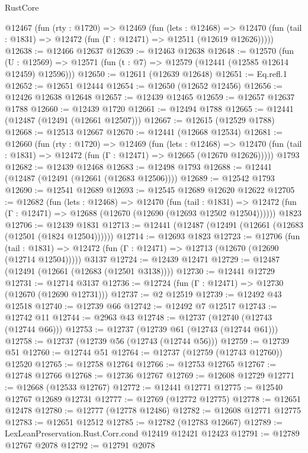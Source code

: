 \begin{lexlean}{RustCore}
\begin{coremodule}
  @12467
    (fun (rty : @1720) =>
    @12469
      (fun (lets : @12468) =>
      @12470 (fun (tail : @1831) => @12472 (fun (Γ : @12471) => @12511 (@12619 @12626)))))
@12638 := @12466 @12637
@12639 := @12463 @12638
@12648 := @12570
    (fun (U : @12569) => @12571 (fun (t : @7) => @12579 (@12441 (@12585 @12614 @12459) @12596)))
@12650 := @12611 (@12639 @12648)
@12651 := Eq.refl.{1}
@12652 := @12651 @12444
@12654 := @12650 (@12652 @12456)
@12656 := @12426 @12638 @12648
@12657 := @12439 @12465
@12659 := @12657 @12637 @1788
@12660 := @12439 @1720
@12661 := @12494 @1788
@12665 := @12441 (@12487 (@12491 (@12661 @12507)))
@12667 := @12615 (@12529 @1788)
@12668 := @12513 @12667
@12670 := @12441 (@12668 @12534)
@12681 := @12660
    (fun (rty : @1720) =>
    @12469
      (fun (lets : @12468) =>
      @12470 (fun (tail : @1831) => @12472 (fun (Γ : @12471) => @12665 (@12670 @12626)))))
    @1793
@12682 := @12439 @12468
@12683 := @12498 @1793
@12688 := @12441 (@12487 (@12491 (@12661 (@12683 @12506))))
@12689 := @12542 @1793
@12690 := @12541 @12689
@12693 := @12545 @12689 @12620 @12622
@12705 := @12682
    (fun (lets : @12468) =>
    @12470
      (fun (tail : @1831) =>
      @12472 (fun (Γ : @12471) => @12688 (@12670 (@12690 (@12693 @12502 @12504))))))
    @1823
@12706 := @12439 @1831
@12713 := @12441 (@12487 (@12491 (@12661 (@12683 (@12501 (@1824 @12504))))))
@12714 := @12693 @1823
@12723 := @12706
    (fun (tail : @1831) => @12472 (fun (Γ : @12471) => @12713 (@12670 (@12690 (@12714 @12504)))))
    @3137
@12724 := @12439 @12471
@12729 := @12487 (@12491 (@12661 (@12683 (@12501 @3138))))
@12730 := @12441 @12729
@12731 := @12714 @3137
@12736 := @12724 (fun (Γ : @12471) => @12730 (@12670 (@12690 @12731)))
@12737 := @2 @12519
@12739 := @12492 @43 @12518
@12740 := @12739 @66
@12742 := @12492 @7 @12517
@12743 := @12742 @11
@12744 := @2963 @43
@12748 := @12737 (@12740 (@12743 (@12744 @66)))
@12753 := @12737 (@12739 @61 (@12743 (@12744 @61)))
@12758 := @12737 (@12739 @56 (@12743 (@12744 @56)))
@12759 := @12739 @51
@12760 := @12744 @51
@12764 := @12737 (@12759 (@12743 @12760)) @12520
@12765 := @12758 @12764
@12766 := @12753 @12765
@12767 := @12748 @12766
@12768 := @12736 @12767
@12769 := @12608 @12729
@12771 := @12668 (@12533 @12767)
@12772 := @12441 @12771
@12775 := @12540 @12767 @12689 @12731
@12777 := @12769 (@12772 @12775)
@12778 := @12651 @12478
@12780 := @12777 (@12778 @12486)
@12782 := @12608 @12771 @12775
@12783 := @12651 @12512
@12785 := @12782 (@12783 @12667)
@12789 := LexLeanPreservation.Rust.Corr.cond @12419 @12421 @12423
@12791 := @12789 @12767 @2078
@12792 := @12791 @2078

\end{coremodule}
\end{lexlean}

